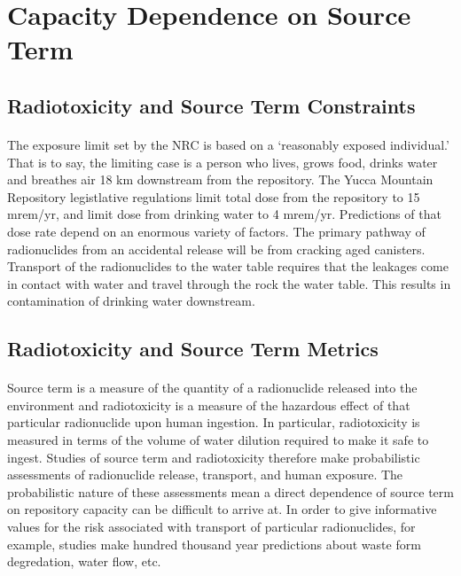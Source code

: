 \section{Capacity Dependence on Source Term}
\subsection{Radiotoxicity and Source Term Constraints}
\paragraph{}
The exposure limit set by the NRC is based on a `reasonably exposed individual.' That is to say, the limiting case is a person who lives, grows food, drinks water and breathes air 18 km downstream from the repository. The Yucca Mountain Repository legistlative regulations limit total dose from the repository to 15 mrem/yr, and limit dose from drinking water to 4 mrem/yr. Predictions of that dose rate depend on an enormous variety of factors. The primary pathway of radionuclides from an accidental release will be from cracking aged canisters. Transport of the radionuclides to the water table requires that the leakages come in contact with water and travel through the rock the water table. This results in contamination of drinking water downstream. 
\subsection{Radiotoxicity and Source Term Metrics}
\paragraph{}
Source term is a measure of the quantity of a radionuclide released into the environment and radiotoxicity is a measure of the hazardous effect of that particular radionuclide upon human ingestion. In particular, radiotoxicity is measured in terms of the volume of water dilution required to make it safe to ingest. Studies of source term and radiotoxicity therefore make probabilistic assessments of radionuclide release, transport, and human exposure. The probabilistic nature of these assessments mean a direct dependence of source term on repository capacity can be difficult to arrive at. In order to give informative values for the risk associated with transport of particular radionuclides, for example, studies make hundred thousand year predictions about waste form degredation, water flow, etc. 
